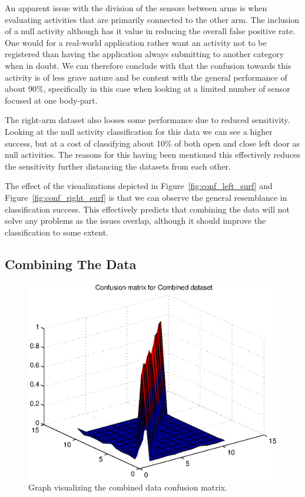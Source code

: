 \documentclass{sig-alternate}
\begin{document}
An apparent issue with the division of the sensors between arms is when evaluating activities that are primarily connected to the other arm. The inclusion of a null activity although has it value in reducing the overall false positive rate. One would for a real-world application rather want an activity not to be registered than having the application always submitting to another category when in doubt. We can therefore conclude with that the confusion towards this activity is of less grave nature and be content with the general performance of about 90\%, specifically in this case when looking at a limited number of sensor focused at one body-part.

The right-arm dataset also looses some performance due to reduced sensitivity. Looking at the null activity classification for this data we can see a higher success, but at a cost of classifying about 10\% of both open and close left door as null activities. The reasons for this having been mentioned this effectively reduces the sensitivity further distancing the datasets from each other.

The effect of the visualizations depicted in Figure~\ref{fig:conf_left_surf} and Figure~\ref{fig:conf_right_surf} is that we can observe the general resemblance in classification success. This effectively predicts that combining the data will not solve any problems as the issues overlap, although it should improve the classification to some extent.

\subsection{Combining The Data}

\begin{figure}[bp]
  \centering
  \includegraphics[scale=0.4]{./matlab_output/nConfkNN_both.eps}
  \caption{Graph visualizing the combined data confusion matrix.}
  \label{fig:conf_both_surf}
\end{figure}
\end{document}
